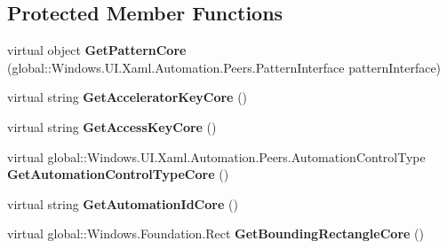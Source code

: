 \subsection*{Protected Member Functions}
\begin{DoxyCompactItemize}
\item 
\mbox{\label{class_windows_1_1_u_i_1_1_xaml_1_1_automation_1_1_peers_1_1_automation_peer_aa044472b4231fb26f5f1f9c526533020}} 
virtual object {\bfseries Get\+Pattern\+Core} (global\+::\+Windows.\+U\+I.\+Xaml.\+Automation.\+Peers.\+Pattern\+Interface pattern\+Interface)
\item 
\mbox{\label{class_windows_1_1_u_i_1_1_xaml_1_1_automation_1_1_peers_1_1_automation_peer_a9781a8d9c5fdebc0deb28ddc4586e09a}} 
virtual string {\bfseries Get\+Accelerator\+Key\+Core} ()
\item 
\mbox{\label{class_windows_1_1_u_i_1_1_xaml_1_1_automation_1_1_peers_1_1_automation_peer_a3d4baa373625c8c650d5f410d99b44ba}} 
virtual string {\bfseries Get\+Access\+Key\+Core} ()
\item 
\mbox{\label{class_windows_1_1_u_i_1_1_xaml_1_1_automation_1_1_peers_1_1_automation_peer_af2422569cceaff985ea73cae254225e7}} 
virtual global\+::\+Windows.\+U\+I.\+Xaml.\+Automation.\+Peers.\+Automation\+Control\+Type {\bfseries Get\+Automation\+Control\+Type\+Core} ()
\item 
\mbox{\label{class_windows_1_1_u_i_1_1_xaml_1_1_automation_1_1_peers_1_1_automation_peer_a014ee70abfd483498acd60d958afc21e}} 
virtual string {\bfseries Get\+Automation\+Id\+Core} ()
\item 
\mbox{\label{class_windows_1_1_u_i_1_1_xaml_1_1_automation_1_1_peers_1_1_automation_peer_a3c155bdaac9b35e1c7bb423d47fd707d}} 
virtual global\+::\+Windows.\+Foundation.\+Rect {\bfseries Get\+Bounding\+Rectangle\+Core} ()
\item 

\end{DoxyCompactItemize}
